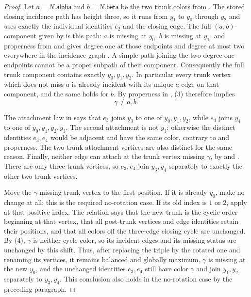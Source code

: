 \begin{proof}
Let $a=N.\mathsf{alpha}$ and $b=N.\mathsf{beta}$ be the two trunk colors
from .  The stored closing incidence
path has height three, so it runs from $y_1$ to $y_0$ through $y_2$ and
uses exactly the individual identities $e_2$ and the closing edge.  The
full $(a,b)$-component given by  is this
path: $a$ is missing at $y_0$, $b$ is missing at $y_1$, and properness
from  and  gives degree one
at those endpoints and degree at most two everywhere in the incidence
graph .  A simple path joining the two
degree-one endpoints cannot be a proper subpath of their component.
Consequently the full trunk component contains exactly
$y_0,y_1,y_2$.  In particular every trunk vertex which does not miss $a$
is already incident with its unique $a$-edge on that component, and the
same holds for $b$.  By properness in
, (3) therefore implies
\[
 \gamma\ne a,b. \tag{4}
\]

The attachment law in  says that $e_3$ joins $y_3$
to one of $y_0,y_1,y_2$, while $e_4$ joins $y_4$ to one of
$y_0,y_1,y_2,y_3$.  The second attachment is not $y_3$: otherwise the
distinct identities $e_3,e_4$ would be adjacent and have the same color,
contrary to  and properness.  The two trunk
attachment vertices are also distinct for the same reason.  Finally,
neither edge can attach at the trunk vertex missing $\gamma$, by
 and .  There are only
three trunk vertices, so $e_3,e_4$ join $y_3,y_4$ separately to exactly
the other two trunk vertices.

Move the $\gamma$-missing trunk vertex to the first position.  If it is
already $y_0$, make no change at all; this is the required no-rotation
case.  If its old index is $1$ or $2$, apply
 at that positive index.  The
relation  says that the new trunk is the cyclic
order beginning at that vertex, that all post-trunk vertices and edge
identities retain their positions, and that all colors off the three-edge
closing cycle are unchanged.  By (4), $\gamma$ is neither cycle color, so
its incident edges and its missing status are unchanged by this shift.
Thus, after replacing the triple by the
rotated one and renaming its vertices, it remains balanced and globally
maximum, $\gamma$ is missing at the new $y_0$, and the unchanged identities
$e_3,e_4$ still have color $\gamma$ and join $y_1,y_2$ separately to
$y_3,y_4$.  This conclusion also holds in the no-rotation case by the
preceding paragraph.


\end{proof}
